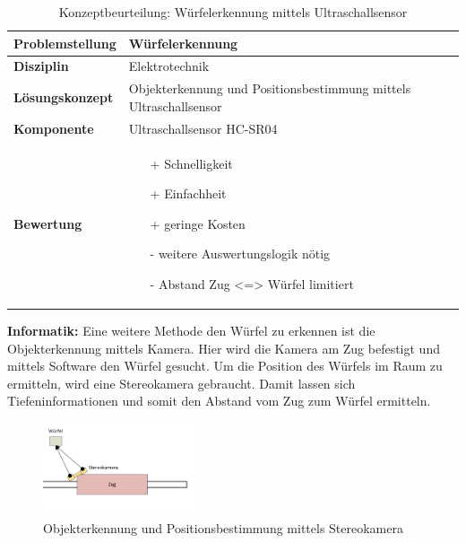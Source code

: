 \documentclass[../../main.tex]{subfiles}
\begin{document}
    \begin{flushleft}
        \begin{table}[h]
        \begin{tabular}{ | l | p{11cm} |}
        \hline
        \textbf{Problemstellung} & Würfelerkennung \\ \hline
        \textbf{Disziplin} & Elektrotechnik \\ \hline
        \textbf{Lösungskonzept} & Objekterkennung und Positionsbestimmung mittels Ultraschallsensor \\ \hline
        \textbf{Komponente} & Ultraschallsensor HC-SR04 \\ \hline
        \textbf{Bewertung} &  \begin{itemize}
                                \item[+] Schnelligkeit
                                \item[+] Einfachheit
                                \item[+] geringe Kosten 
                                \item[-] weitere Auswertungslogik nötig
                                \item[-] Abstand Zug <=> Würfel limitiert   
                              \end{itemize} \\ \hline
        \end{tabular}
        \caption{Konzeptbeurteilung: Würfelerkennung mittels Ultraschallsensor}
        \label{tab:konzept_wurfel_ultraschall}
    \end{table}
    \end{flushleft}

    \vspace{0.5cm}
    \textbf{Informatik: }
    Eine weitere Methode den Würfel zu erkennen ist die Objekterkennung mittels Kamera. Hier wird die Kamera am Zug
    befestigt und mittels Software den Würfel gesucht. Um die Position des Würfels im Raum zu ermitteln, wird eine 
    Stereokamera gebraucht. Damit lassen sich Tiefeninformationen und somit den Abstand vom Zug zum Würfel ermitteln.\\
    
    \begin{figure}[H] %
        \centering
        \includegraphics[width=0.4\textwidth]{wurfel_Stereokamera.png}
        \caption{Objekterkennung und Positionsbestimmung mittels Stereokamera}
    \end{figure}
\end{document}
